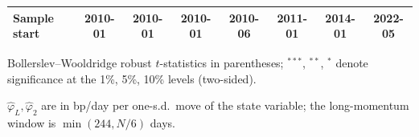 \begin{table}[htbp]
\begin{threeparttable}
\begin{tabular}{lccccccc}
Sample start & \scriptsize 2010-01 & \scriptsize 2010-01 & \scriptsize 2010-01 & \scriptsize 2010-06 & \scriptsize 2011-01 & \scriptsize 2014-01 & \scriptsize 2022-05 \\
\bottomrule
\end{tabular}
\begin{tablenotes}\scriptsize
\item Bollerslev--Wooldridge robust $t$-statistics in parentheses; $^{***}$, $^{**}$, $^{*}$ denote significance at the 1\%, 5\%, 10\% levels (two-sided).
\item $\hat\varphi_L,\hat\varphi_2$ are in bp/day per one-s.d.\ move of the state variable; the long-momentum window is $\min(244,N/6)$ days.
\end{tablenotes}\end{threeparttable}\end{table}

